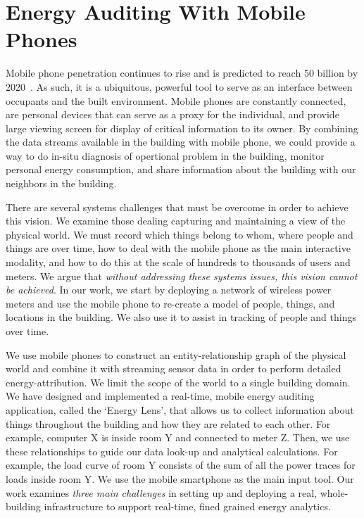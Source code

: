 \section{Energy Auditing With Mobile Phones} 

Mobile phone penetration continues to rise and is predicted to reach 50 billion by 2020~\cite{mobile2020}.  As such, it is a ubiquitous,
powerful tool to serve as an interface between occupants and the built environment.  Mobile phones are constantly connected, 
are personal devices that can serve as a proxy for the individual, and provide large viewing screen for display of critical information
to its owner.  By combining the data streams available in the building with mobile phone, we could provide a way to
do in-situ diagnosis of opertional problem in the building, monitor personal energy consumption, and share information about
the building with our neighbors in the building.

There are several systems challenges that must be overcome in order to achieve this vision.
We examine those dealing capturing and maintaining a view of the physical world.  We must record which things belong to whom, 
where people
and things are over time, how to deal with the mobile phone as the main interactive modality, and how to do this at the scale of 
hundreds to thousands of users and meters.  We argue that \emph{without addressing these systems issues, this
vision cannot be achieved}.  In our work, we start by deploying a network of wireless power meters and use the mobile
phone to re-create a model of people, things, and locations in the building.  We also use it to assist in tracking of 
people and things over time.

We use mobile phones to construct an entity-relationship 
graph of the physical world and combine it with streaming sensor data in order to perform detailed energy-attribution.
We limit the scope of the world to a single building domain.  We have designed and implemented a real-time, mobile energy auditing
application, called the `Energy Lens', that allows us to collect information about 
things throughout the building and how they are related to each other.  For example, computer X is inside 
room Y and connected to meter Z.  Then, we use these relationships to guide our data look-up and analytical
calculations.  For example, the load curve of room Y consists of the sum of all the power traces for loads
inside room Y.  We use the mobile smartphone as the main input tool.  Our work examines \emph{three main challenges} in setting up and 
deploying a real, whole-building infrastructure to support real-time, 
fined grained energy analytics.  

